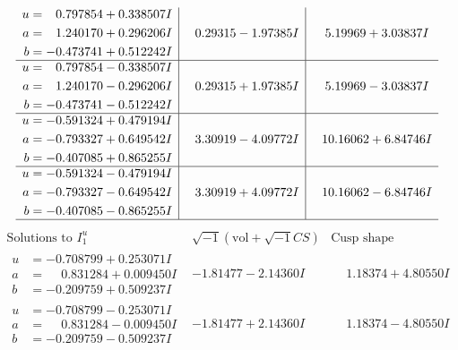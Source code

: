 \documentclass[1p]{elsarticle_modified}
\theoremstyle{definition}
\newcommand{\I}{\sqrt{-1}}
\begin{document}
$$\begin{array}{c|c|c}
\begin{aligned}
u &= \phantom{-}0.797854 + 0.338507 I \\
a &= \phantom{-}1.240170 + 0.296206 I \\
b &= -0.473741 + 0.512242 I\end{aligned}
 & \phantom{-}0.29315 - 1.97385 I & \phantom{-}5.19969 + 3.03837 I \\ \hline\begin{aligned}
u &= \phantom{-}0.797854 - 0.338507 I \\
a &= \phantom{-}1.240170 - 0.296206 I \\
b &= -0.473741 - 0.512242 I\end{aligned}
 & \phantom{-}0.29315 + 1.97385 I & \phantom{-}5.19969 - 3.03837 I \\ \hline\begin{aligned}
u &= -0.591324 + 0.479194 I \\
a &= -0.793327 + 0.649542 I \\
b &= -0.407085 + 0.865255 I\end{aligned}
 & \phantom{-}3.30919 - 4.09772 I & \phantom{-}10.16062 + 6.84746 I \\ \hline\begin{aligned}
u &= -0.591324 - 0.479194 I \\
a &= -0.793327 - 0.649542 I \\
b &= -0.407085 - 0.865255 I\end{aligned}
 & \phantom{-}3.30919 + 4.09772 I & \phantom{-}10.16062 - 6.84746 I\\
 \hline 
 \end{array}$$\newpage$$\begin{array}{c|c|c}  
\text{Solutions to }I^u_{1}& \I (\text{vol} + \sqrt{-1}CS) & \text{Cusp shape}\\
 \hline 
\begin{aligned}
u &= -0.708799 + 0.253071 I \\
a &= \phantom{-}0.831284 + 0.009450 I \\
b &= -0.209759 + 0.509237 I\end{aligned}
 & -1.81477 - 2.14360 I & \phantom{-}1.18374 + 4.80550 I \\ \hline\begin{aligned}
u &= -0.708799 - 0.253071 I \\
a &= \phantom{-}0.831284 - 0.009450 I \\
b &= -0.209759 - 0.509237 I\end{aligned}
 & -1.81477 + 2.14360 I & \phantom{-}1.18374 - 4.80550 I \\ \hline\begin{aligned}

\end{aligned}
\end{array}$$
\end{document}
